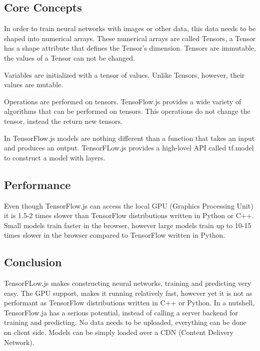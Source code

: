 \subsection{Core Concepts}

In order to train neural networks with images or other data, this data needs to be shaped into numerical arrays. These numerical arrays are called Tensors, a Tensor has a shape attribute that defines the Tensor's dimension. Tensors are immutable, the values of a Tensor can not be changed.



Variables are initialized with a tensor of values. Unlike Tensors, however, their values are mutable.



Operations are performed on tensors. TensoFlow.js provides a wide variety of algorithms that can be performed on tensors. This operations do not change the tensor, instead the return new tensors.



In TensorFlow.js models are nothing different than a function that takes an input and produces an output. TensorFLow.js provides a high-lovel API called tf.model to construct a model with layers.



\subsection{Performance}
Even though TensorFlow.js can access the local GPU (Graphics Processing Unit) it is 1.5-2 times slower than TensorFlow distributions written in Python or C++. 
Small models train faster in the browser, however large models train up to 10-15 times slower in the browser compared to TensorFlow written in Python.

\subsection{Conclusion}
TensorFLow.js makes constructing neural networks, training and predicting very easy. The GPU support, makes it running relatively fast, however yet it is not as performant as TensorFlow distributions written in C++ or Python. In a nutshell, TensorFlow.ja has a serious potential, instead of calling a server backend for training and predicting. No data needs to be uploaded, everything can be done on client side. Models can be simply loaded over a CDN (Content Delivery Network).

